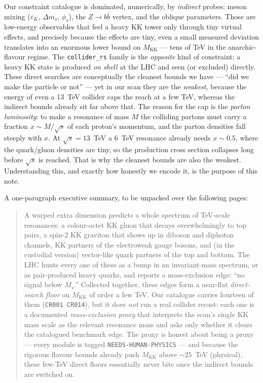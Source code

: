 \documentclass[11pt]{article}
\newcommand{\MKK}{M_{\mathrm{KK}}}
\newcommand{\eps}{\varepsilon}
\newcommand{\code}[1]{\texttt{#1}}
\theoremstyle{definition}
\begin{document}
Our constraint catalogue is dominated, numerically, by \emph{indirect} probes:
meson mixing ($\eps_K$, $\Delta m_s$, $\phi_s$), the $Z\to b\bar b$ vertex, and
the oblique parameters. Those are low-energy observables that feel a heavy KK
tower only through tiny virtual effects, and precisely because the effects are
tiny, even a small measured deviation translates into an enormous lower bound on
$\MKK$ --- tens of TeV in the anarchic-flavour regime. The \code{collider\_rs}
family is the \emph{opposite} kind of constraint: a heavy KK state is produced
\emph{on shell} at the LHC and seen (or excluded) directly. These direct
searches are conceptually the cleanest bounds we have --- ``did we make the
particle or not'' --- yet in our scan they are the \emph{weakest}, because the
energy of even a 13~TeV collider caps the reach at a few TeV, whereas the
indirect bounds already sit far above that. The reason for the cap is the
\emph{parton luminosity}: to make a resonance of mass $M$ the colliding partons
must carry a fraction $x\sim M/\sqrt{s}$ of each proton's momentum, and the
parton densities fall steeply with $x$. At $\sqrt s = 13$~TeV a 6~TeV resonance
already needs $x\sim 0.5$, where the quark/gluon densities are tiny, so the
production cross section collapses long before $\sqrt s$ is reached. That is why
the cleanest bounds are also the weakest. Understanding this, and exactly how
honestly we encode it, is the purpose of this note.

A one-paragraph executive summary, to be unpacked over the following pages:

\begin{quote}
\small
A warped extra dimension predicts a whole spectrum of TeV-scale resonances: a
colour-octet KK gluon that decays overwhelmingly to top pairs, a spin-2 KK
graviton that shows up in diboson and diphoton channels, KK partners of the
electroweak gauge bosons, and (in the custodial version) vector-like quark
partners of the top and bottom. The LHC hunts every one of these as a bump in an
invariant-mass spectrum, or as pair-produced heavy quarks, and reports a
mass-exclusion edge: ``no signal below $M_\star$.'' Collected together, these
edges form a near-flat \emph{direct-search floor} on $\MKK$ of order a few TeV.
Our catalogue carries fourteen of them (\code{CR001}--\code{CR014}), but it does
\emph{not} run a real collider recast: each one is a documented
\emph{mass-exclusion proxy} that interprets the scan's single KK mass scale as
the relevant resonance mass and asks only whether it clears the catalogued
benchmark edge. The proxy is honest about being a proxy --- every module is
tagged \code{NEEDS-HUMAN-PHYSICS} --- and because the rigorous flavour bounds
already push $\MKK$ above $\sim 25$~TeV (physical), these few-TeV direct floors
essentially never bite once the indirect bounds are switched on.
\end{quote}
\end{document}
